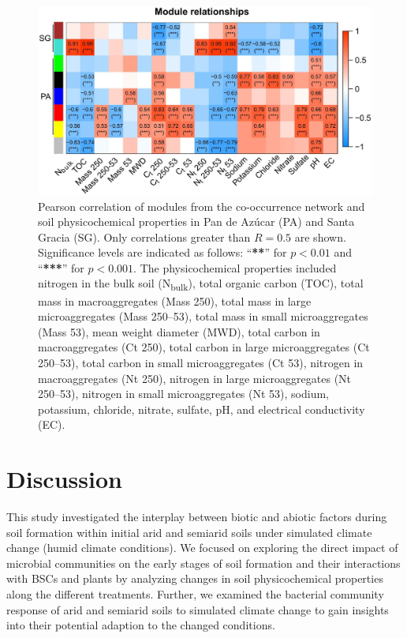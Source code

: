 \begin{figure}[H]
	\centering
	\includegraphics[width=1\textwidth]{img/M3-Figure_8.jpg}
	\caption{
	Pearson correlation of modules from the co-occurrence network and soil physicochemical properties in Pan de Azúcar (PA) and Santa Gracia (SG). Only correlations greater than $R = 0.5$ are shown. Significance levels are indicated as follows: ``\textbf{**}'' for $p < 0.01$ and ``\textbf{***}'' for $p < 0.001$.
	The physicochemical properties included nitrogen in the bulk soil (N\textsubscript{bulk}), total organic carbon (TOC), total mass in macroaggregates (Mass 250), total mass in large microaggregates (Mass 250--53), total mass in small microaggregates (Mass 53), mean weight diameter (MWD), total carbon in macroaggregates (Ct 250), total carbon in large microaggregates (Ct 250--53), total carbon in small microaggregates (Ct 53), nitrogen in macroaggregates (Nt 250), nitrogen in large microaggregates (Nt 250--53), nitrogen in small microaggregates (Nt 53), sodium, potassium, chloride, nitrate, sulfate, pH, and electrical conductivity (EC).
	}
	\label{fig:M3-F8}
\end{figure}

\section{Discussion}

This study investigated the interplay between biotic and abiotic factors during soil formation within initial arid and semiarid soils under simulated climate change (humid climate conditions). We focused on exploring the direct impact of microbial communities on the early stages of soil formation and their interactions with BSCs and plants by analyzing changes in soil physicochemical properties along the different treatments. Further, we examined the bacterial community response of arid and semiarid soils to simulated climate change to gain insights into their potential adaption to the changed conditions.

